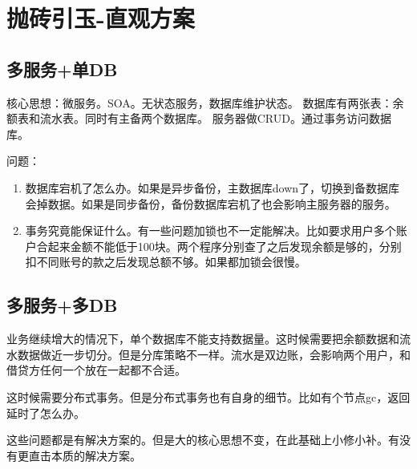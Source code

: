 \chapter{抛砖引玉-直观方案}


\section{多服务+单DB}
核心思想：微服务。SOA。无状态服务，数据库维护状态。
数据库有两张表：余额表和流水表。同时有主备两个数据库。
服务器做CRUD。通过事务访问数据库。

问题：
\begin{enumerate}
    \item 数据库宕机了怎么办。如果是异步备份，主数据库down了，切换到备数据库会掉数据。如果是同步备份，备份数据库宕机了也会影响主服务器的服务。
    \item 事务究竟能保证什么。有一些问题加锁也不一定能解决。比如要求用户多个账户合起来金额不能低于100块。两个程序分别查了之后发现余额是够的，分别扣不同账号的款之后发现总额不够。如果都加锁会很慢。
\end{enumerate}

\section{多服务+多DB}
业务继续增大的情况下，单个数据库不能支持数据量。这时候需要把余额数据和流水数据做近一步切分。但是分库策略不一样。流水是双边账，会影响两个用户，和借贷方任何一个放在一起都不合适。

这时候需要分布式事务。但是分布式事务也有自身的细节。比如有个节点gc，返回延时了怎么办。

这些问题都是有解决方案的。但是大的核心思想不变，在此基础上小修小补。有没有更直击本质的解决方案。